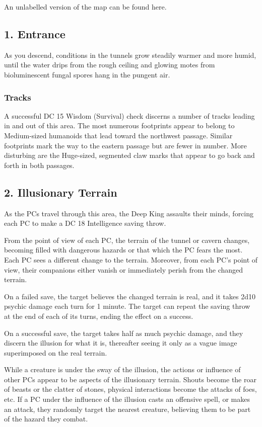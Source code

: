 \documentclass[10pt,a4paper,twoside,bg=print,twocolumn,openany,nodeprecatedcode]{dndbook}
\begin{document}
An unlabelled version of the map can be found here.

\subsection{1. Entrance}
\begin{DndReadAloud}{}
As you descend, conditions in the tunnels grow steadily warmer and more humid, until the water drips from the rough ceiling and glowing motes from bioluminescent fungal spores hang in the pungent air.

\end{DndReadAloud}

\subsubsection{Tracks}
A successful DC 15 Wisdom (Survival) check discerns a number of tracks leading in and out of this area. The most numerous footprints appear to belong to Medium-sized humanoids that lead toward the northwest passage. Similar footprints mark the way to the eastern passage but are fewer in number. More disturbing are the Huge-sized, segmented claw marks that appear to go back and forth in both passages.

\subsection{2. Illusionary Terrain}
As the PCs travel through this area, the Deep King assaults their minds, forcing each PC to make a DC 18 Intelligence saving throw.

From the point of view of each PC, the terrain of the tunnel or cavern changes, becoming filled with dangerous hazards or that which the PC fears the most. Each PC sees a different change to the terrain. Moreover, from each PC's point of view, their companions either vanish or immediately perish from the changed terrain.

On a failed save, the target believes the changed terrain is real, and it takes 2d10 psychic damage each turn for 1 minute. The target can repeat the saving throw at the end of each of its turns, ending the effect on a success.

On a successful save, the target takes half as much psychic damage, and they discern the illusion for what it is, thereafter seeing it only as a vague image superimposed on the real terrain.

While a creature is under the sway of the illusion, the actions or influence of other PCs appear to be aspects of the illusionary terrain. Shouts become the roar of beasts or the clatter of stones, physical interactions become the attacks of foes, etc. If a PC under the influence of the illusion casts an offensive spell, or makes an attack, they randomly target the nearest creature, believing them to be part of the hazard they combat.
\end{document}
